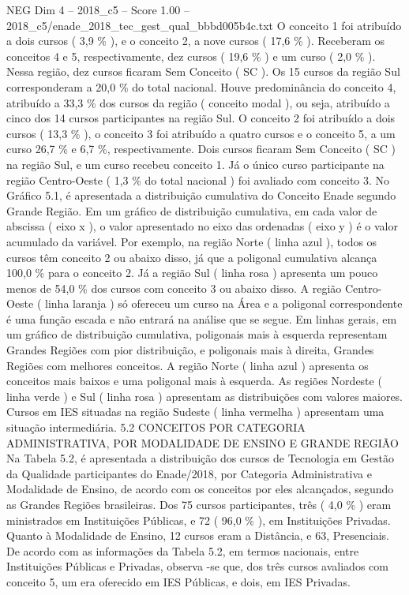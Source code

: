 \begin{textsample}{NEG Dim 4 – 2018\_c5 – Score 1.00 – 2018\_c5/enade\_2018\_tec\_gest\_qual\_bbbd005b4c.txt}
O conceito 1 foi atribuído a dois cursos ( 3,9 \% ), e o conceito 2, a nove cursos ( 17,6 \% ).
Receberam os conceitos 4 e 5, respectivamente, dez cursos ( 19,6 \% ) e um curso ( 2,0 \% ).
Nessa região, dez cursos ficaram Sem Conceito ( SC ).
Os 15 cursos da região Sul corresponderam a 20,0 \% do total nacional.
Houve predominância do conceito 4, atribuído a 33,3 \% dos cursos da região ( conceito modal ), ou seja, atribuído a cinco dos 14 cursos participantes na região Sul.
O conceito 2 foi atribuído a dois cursos ( 13,3 \% ), o conceito 3 foi atribuído a quatro cursos e o conceito 5, a um curso 26,7 \% e 6,7 \%, respectivamente.
Dois cursos ficaram Sem Conceito ( SC ) na região Sul, e um curso recebeu conceito 1.
Já o único curso participante na região Centro-Oeste ( 1,3 \% do total nacional ) foi avaliado com conceito 3.
No Gráfico 5.1, é apresentada a distribuição cumulativa do Conceito Enade segundo Grande Região.
Em um gráfico de distribuição cumulativa, em cada valor de abscissa ( eixo x ), o valor apresentado no eixo das ordenadas ( eixo y ) é o valor acumulado da variável.
Por exemplo, na região Norte ( linha azul ), todos os cursos têm conceito 2 ou abaixo disso, já que a poligonal cumulativa alcança 100,0 \% para o conceito 2.
Já a região Sul ( linha rosa ) apresenta um pouco menos de 54,0 \% dos cursos com conceito 3 ou abaixo disso.
A região Centro-Oeste ( linha laranja ) só ofereceu um curso na Área e a poligonal correspondente é uma função escada e não entrará na análise que se segue.
Em linhas gerais, em um gráfico de distribuição cumulativa, poligonais mais à esquerda representam Grandes Regiões com pior distribuição, e poligonais mais à direita, Grandes Regiões com melhores conceitos.
A região Norte ( linha azul ) apresenta os conceitos mais baixos e uma poligonal mais à esquerda.
As regiões Nordeste ( linha verde ) e Sul ( linha rosa ) apresentam as distribuições com valores maiores.
Cursos em IES situadas na região Sudeste ( linha vermelha ) apresentam uma situação intermediária. 5.2 CONCEITOS POR CATEGORIA ADMINISTRATIVA, POR MODALIDADE DE ENSINO E GRANDE REGIÃO Na Tabela 5.2, é apresentada a distribuição dos cursos de Tecnologia em Gestão da Qualidade participantes do Enade/2018, por Categoria Administrativa e Modalidade de Ensino, de acordo com os conceitos por eles alcançados, segundo as Grandes Regiões brasileiras.
Dos 75 cursos participantes, três ( 4,0 \% ) eram ministrados em Instituições Públicas, e 72 ( 96,0 \% ), em Instituições Privadas.
Quanto à Modalidade de Ensino, 12 cursos eram a Distância, e 63, Presenciais.
De acordo com as informações da Tabela 5.2, em termos nacionais, entre Instituições Públicas e Privadas, observa -se que, dos três cursos avaliados com conceito 5, um era oferecido em IES Públicas, e dois, em IES Privadas.

\end{textsample}
